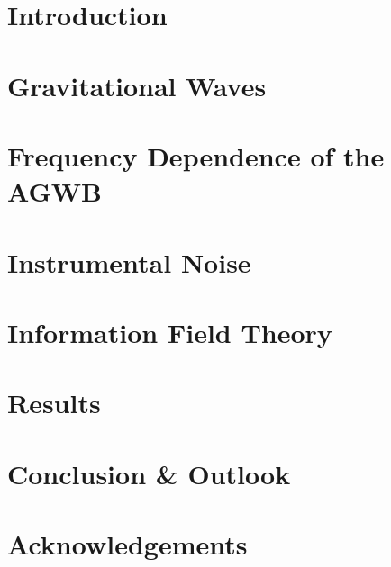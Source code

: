\documentclass[twoside, 12pt, openany]{book}
\let\chaptername\relax
\begin{document}
\newpage
\begin{spacing}{1}
\tableofcontents
{}
\end{spacing}
\newpage

\mainmatter
{}
\pagestyle{fancy}
\renewcommand{\chaptermark}[1]{\markboth{#1}{#1}}
\fancyhead[R]{}
\fancyhead[L]{\MakeUppercase{\chaptername\ \thechapter\ --\ \leftmark} \newline
                \vspace{-0.7cm}
                \noindent\rule{\linewidth}{0.4pt}}
\chapter{Introduction}


\chapter{Gravitational Waves}
\label{gw_chapter}


\chapter{Frequency Dependence of the AGWB}
\label{frequency_chapter}


\chapter{Instrumental Noise}
\label{comp_sep}


\chapter{Information Field Theory}
\label{ift_chapter}


\chapter{Results}
\label{results_chapter}


\chapter{Conclusion \& Outlook}
\label{conclusion_chapter}



\chapter*{Acknowledgements}



\newpage
{}
\printbibliography


\appendix

\end{document}
